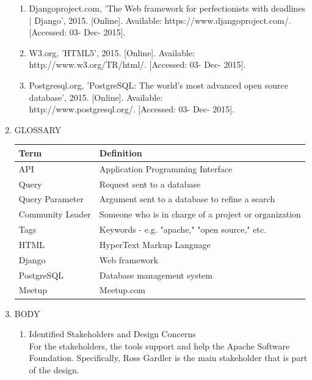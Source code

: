 \documentclass[draftclsnofoot,10pt,onecolumn]{IEEEtran} %
\begin{document}
\begin{enumerate}
\begin{enumerate}
		\item Djangoproject.com, 'The Web framework for perfectionists with deadlines | Django', 2015. [Online]. Available:
		https://www.djangoproject.com/. [Accessed: 03- Dec- 2015]. \\
		
		\item W3.org, 'HTML5', 2015. [Online]. Available: http://www.w3.org/TR/html/. [Accessed: 03- Dec- 2015]. \\
		
		\item Postgresql.org, 'PostgreSQL: The world's most advanced open source database', 2015. [Online]. Available:\\
		http://www.postgresql.org/. [Accessed: 03- Dec- 2015]. \\
		
	\end{enumerate}

\item GLOSSARY

\begin{longtable}[1]{ | C{7cm} | C{7cm} |} 
\hline
Term & Definition \\ 
\hline
API & Application Programming Interface\\
\hline
Query & Request sent to a database
\\
\hline
Query Parameter & Argument sent to a database to refine a search
\\
\hline
Community Leader & Someone who is in charge of a project or organization
\\
\hline
Tags &  Keywords - e.g. "apache," "open source," etc.
\\
\hline
HTML & HyperText Markup Language
\\
\hline
Django & Web framework
\\
\hline
PostgreSQL & Database management system
\\
\hline
Meetup & Meetup.com
\\
\hline
\end{longtable}

\item BODY \\
	\begin{enumerate}
		\item Identified Stakeholders and Design Concerns \\
		For the stakeholders, the tools support and help the Apache Software Foundation. Specifically, Ross Gardler is the
		main stakeholder that is part of the design.\\
		

\end{enumerate}
\end{enumerate}
\end{document}
